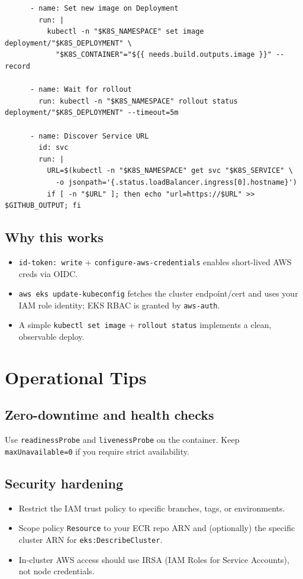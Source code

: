 \documentclass[11pt]{article}
\begin{document}
\begin{verbatim}
      - name: Set new image on Deployment
        run: |
          kubectl -n "$K8S_NAMESPACE" set image deployment/"$K8S_DEPLOYMENT" \
            "$K8S_CONTAINER"="${{ needs.build.outputs.image }}" --record

      - name: Wait for rollout
        run: kubectl -n "$K8S_NAMESPACE" rollout status deployment/"$K8S_DEPLOYMENT" --timeout=5m

      - name: Discover Service URL
        id: svc
        run: |
          URL=$(kubectl -n "$K8S_NAMESPACE" get svc "$K8S_SERVICE" \
            -o jsonpath='{.status.loadBalancer.ingress[0].hostname}')
          if [ -n "$URL" ]; then echo "url=https://$URL" >> $GITHUB_OUTPUT; fi
\end{verbatim}
\clearpage

\subsection{Why this works}
\begin{itemize}
  \item \texttt{id-token: write} + \texttt{configure-aws-credentials} enables short-lived AWS creds via OIDC.
  \item \texttt{aws eks update-kubeconfig} fetches the cluster endpoint/cert and uses your IAM role identity; EKS RBAC is granted by \texttt{aws-auth}.
  \item A simple \texttt{kubectl set image} + \texttt{rollout status} implements a clean, observable deploy.
\end{itemize}

\section{Operational Tips}
\subsection{Zero-downtime and health checks}
Use \texttt{readinessProbe} and \texttt{livenessProbe} on the container. Keep \texttt{maxUnavailable=0} if you require strict availability.

\subsection{Security hardening}
\begin{itemize}
  \item Restrict the IAM trust policy to specific branches, tags, or environments.
  \item Scope policy \texttt{Resource} to your ECR repo ARN and (optionally) the specific cluster ARN for \texttt{eks:DescribeCluster}.
  \item In-cluster AWS access should use IRSA (IAM Roles for Service Accounts), not node credentials.
\end{itemize}
\end{document}
